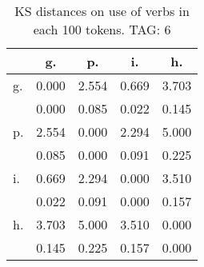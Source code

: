 \begin{table}[h!]
\begin{center}
\begin{tabular}{| l | c | c | c | c |}\hline
 & g. & p. & i. & h. \\\hline
g. & 0.000  & 2.554  & 0.669  & 3.703 \\\hline
 & 0.000  & 0.085  & 0.022  & 0.145 \\\hline
p. & 2.554  & 0.000  & 2.294  & 5.000 \\\hline
 & 0.085  & 0.000  & 0.091  & 0.225 \\\hline
i. & 0.669  & 2.294  & 0.000  & 3.510 \\\hline
 & 0.022  & 0.091  & 0.000  & 0.157 \\\hline
h. & 3.703  & 5.000  & 3.510  & 0.000 \\\hline
 & 0.145  & 0.225  & 0.157  & 0.000 \\\hline
\end{tabular}
\caption{KS distances on use of verbs in each 100 tokens. TAG: 6}
\end{center}
\end{table}